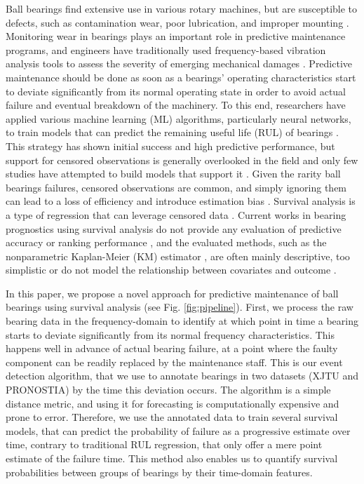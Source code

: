 \documentclass[letterpaper]{article} %
\begin{document}
Ball bearings find extensive use in various rotary machines, but are susceptible to defects, such as contamination wear, poor lubrication, and improper mounting \cite{kim_prognostics_2017}. Monitoring wear in bearings plays an important role in predictive maintenance programs, and engineers have traditionally used frequency-based vibration analysis tools to assess the severity of emerging mechanical damages \cite{randall_vibration_2021, randall_rolling_2011}. Predictive maintenance should be done as soon as a bearings' operating characteristics start to deviate significantly from its normal operating state in order to avoid actual failure and eventual breakdown of the machinery. To this end, researchers have applied various machine learning (ML) algorithms, particularly neural networks, to train models that can predict the remaining useful life (RUL) of bearings \cite{guo_recurrent_2017, zheng_data-driven_2018, al_masry_remaining_2019, wang_hybrid_2020, wang_remaining_2022, xu_rul_2022}. This strategy has shown initial success and high predictive performance, but support for censored observations is generally overlooked in the field and only few studies have attempted to build models that support it \cite{widodo_machine_2011, widodo_application_2011, hochstein_survival_2013, wang_remaining_2022}. Given the rarity ball bearings failures, censored observations are common, and simply ignoring them can lead to a loss of efficiency and introduce estimation bias \cite{stepanova_censoring_2002}. Survival analysis is a type of regression that can leverage censored data \cite{gareth_introduction_2021}. Current works in bearing prognostics using survival analysis do not provide any evaluation of predictive accuracy or ranking performance \cite{wang_remaining_2022}, and the evaluated methods, such as the nonparametric Kaplan-Meier (KM) estimator \cite{kaplan_nonparametric_1958}, are often mainly descriptive, too simplistic or do not model the relationship between covariates and outcome \cite{widodo_application_2011}.

In this paper, we propose a novel approach for predictive maintenance of ball bearings using survival analysis (see Fig. \ref{fig:pipeline}). First, we process the raw bearing data in the frequency-domain to identify at which point in time a bearing starts to deviate significantly from its normal frequency characteristics. This happens well in advance of actual bearing failure, at a point where the faulty component can be readily replaced by the maintenance staff. This is our event detection algorithm, that we use to annotate bearings in two datasets (XJTU and PRONOSTIA) by the time this deviation occurs. The algorithm is a simple distance metric, and using it for forecasting is computationally expensive and prone to error. Therefore, we use the annotated data to train several survival models, that can predict the probability of failure as a progressive estimate over time, contrary to traditional RUL regression, that only offer a mere point estimate of the failure time. This method also enables us to quantify survival probabilities between groups of bearings by their time-domain features.
\end{document}
